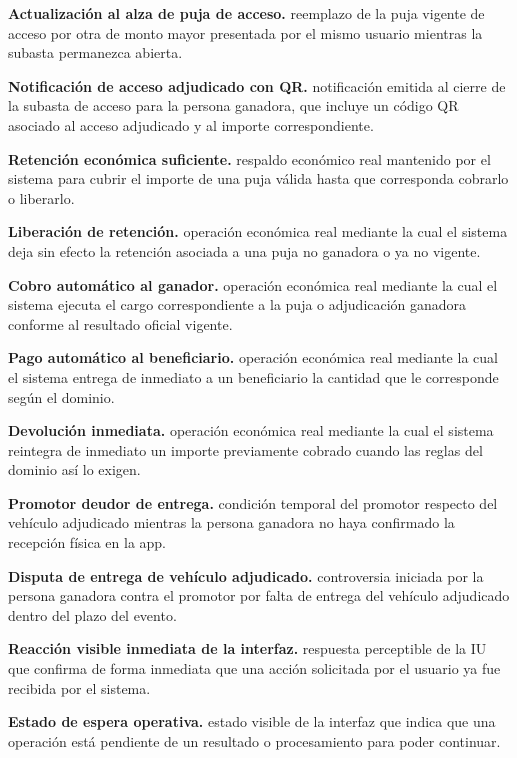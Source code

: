 \documentclass[10pt,letterpaper]{article}
\begin{document}
\noindent\textbf{Actualización al alza de puja de acceso.} reemplazo de la puja vigente de acceso por otra de monto mayor presentada por el mismo usuario mientras la subasta permanezca abierta.\par
\noindent\textbf{Notificación de acceso adjudicado con QR.} notificación emitida al cierre de la subasta de acceso para la persona ganadora, que incluye un código QR asociado al acceso adjudicado y al importe correspondiente.\par
\noindent\textbf{Retención económica suficiente.} respaldo económico real mantenido por el sistema para cubrir el importe de una puja válida hasta que corresponda cobrarlo o liberarlo.\par
\noindent\textbf{Liberación de retención.} operación económica real mediante la cual el sistema deja sin efecto la retención asociada a una puja no ganadora o ya no vigente.\par
\noindent\textbf{Cobro automático al ganador.} operación económica real mediante la cual el sistema ejecuta el cargo correspondiente a la puja o adjudicación ganadora conforme al resultado oficial vigente.\par
\noindent\textbf{Pago automático al beneficiario.} operación económica real mediante la cual el sistema entrega de inmediato a un beneficiario la cantidad que le corresponde según el dominio.\par
\noindent\textbf{Devolución inmediata.} operación económica real mediante la cual el sistema reintegra de inmediato un importe previamente cobrado cuando las reglas del dominio así lo exigen.\par
\noindent\textbf{Promotor deudor de entrega.} condición temporal del promotor respecto del vehículo adjudicado mientras la persona ganadora no haya confirmado la recepción física en la app.\par
\noindent\textbf{Disputa de entrega de vehículo adjudicado.} controversia iniciada por la persona ganadora contra el promotor por falta de entrega del vehículo adjudicado dentro del plazo del evento.\par
\noindent\textbf{Reacción visible inmediata de la interfaz.} respuesta perceptible de la IU que confirma de forma inmediata que una acción solicitada por el usuario ya fue recibida por el sistema.\par
\noindent\textbf{Estado de espera operativa.} estado visible de la interfaz que indica que una operación está pendiente de un resultado o procesamiento para poder continuar.\par
\end{document}
